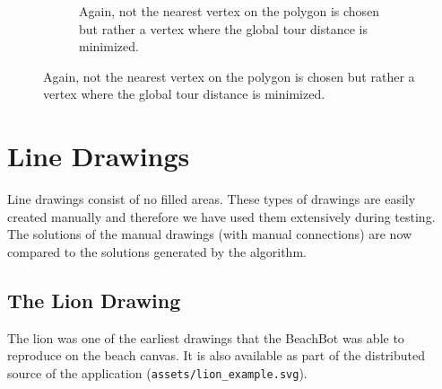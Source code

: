 \begin{figure}
\begin{subfigure}{0.45\textwidth}
\caption{Again, not the nearest vertex on the polygon is chosen but rather a vertex where the global tour distance is minimized.}
\end{subfigure}

\end{figure}

\section{Line Drawings}

Line drawings consist of no filled areas. These types of drawings are easily created manually and therefore we have used them extensively during testing. The solutions of the manual drawings (with manual connections) are now compared to the solutions generated by the algorithm.

\subsection{The Lion Drawing}

The lion was one of the earliest drawings that the BeachBot was able to reproduce on the beach canvas. It is also available as part of the distributed source of the application (\texttt{assets/lion\_example.svg}).

